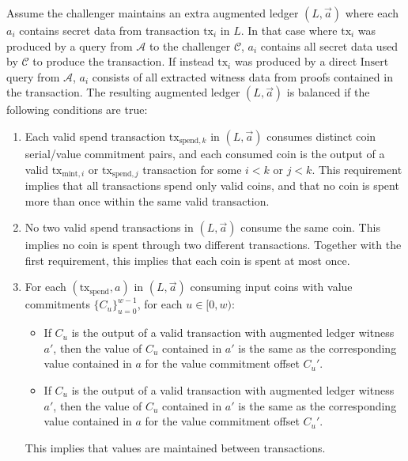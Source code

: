 \documentclass{llncs}
\begin{document}
Assume the challenger maintains an extra augmented ledger $(L, \vec{a})$ where each $a_i$ contains secret data from transaction $\text{tx}_i$ in $L$.
In that case where $\text{tx}_i$ was produced by a query from $\mathcal{A}$ to the challenger $\mathcal{C}$, $a_i$ contains all secret data used by $\mathcal{C}$ to produce the transaction.
If instead $\text{tx}_i$ was produced by a direct $\text{Insert}$ query from $\mathcal{A}$, $a_i$ consists of all extracted witness data from proofs contained in the transaction.
The resulting augmented ledger $(L, \vec{a})$ is balanced if the following conditions are true:
\begin{enumerate}
    \item\label{cond:distinct} Each valid spend transaction $\text{tx}_{\text{spend},k}$ in $(L, \vec{a})$ consumes distinct coin serial/value commitment pairs, and each consumed coin is the output of a valid $\text{tx}_{\text{mint},i}$ or $\text{tx}_{\text{spend},j}$ transaction for some $i < k$ or $j < k$.
    This requirement implies that all transactions spend only valid coins, and that no coin is spent more than once within the same valid transaction.
    
    \item\label{cond:multiple} No two valid spend transactions in $(L, \vec{a})$ consume the same coin.
    This implies no coin is spent through two different transactions.
    Together with the first requirement, this implies that each coin is spent at most once.
    
    \item\label{cond:value} For each $(\text{tx}_{\text{spend}}, a)$ in $(L, \vec{a})$ consuming input coins with value commitments $\{C_u\}_{u=0}^{w-1}$, for each $u \in [0,w)$:
    \begin{itemize}
        \item If $C_u$ is the output of a valid  transaction with augmented ledger witness $a'$, then the value of $C_u$ contained in $a'$ is the same as the corresponding value contained in $a$ for the value commitment offset $C_u'$.
        \item If $C_u$ is the output of a valid  transaction with augmented ledger witness $a'$, then the value of $C_u$ contained in $a'$ is the same as the corresponding value contained in $a$ for the value commitment offset $C_u'$.
    \end{itemize}
    This implies that values are maintained between transactions.
    

\end{enumerate}
\end{document}
